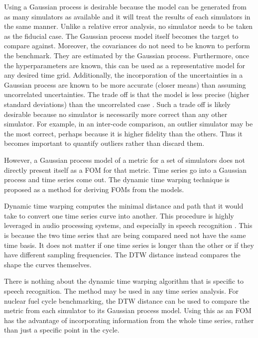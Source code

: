 Using a Gaussian process is desirable because the model can be generated
from as many simulators as available and it will treat the results of
each simulators in the same manner. Unlike a relative error analysis, no 
simulator needs to be taken as the fiducial case. The Gaussian process model 
itself becomes the target to compare against. 
Moreover, the covariances do not need to be known to perform the benchmark.
They are estimated by the Gaussian process. Furthermore, once the 
hyperparameters are known, this can be used as a representative model for 
any desired time grid. Additionally, the incorporation of the uncertainties
in a Gaussian process are known to be more accurate (closer means) than 
assuming uncorrelated uncertainties.  The trade off is that the 
model is less precise (higher standard deviations) than the uncorrelated 
case \cite{hodlr}. Such a trade off is likely desirable because no simulator 
is necessarily more correct than any other simulator. For example, 
in an inter-code comparison, an outlier simulator may be the 
most correct, perhaps because it is higher fidelity than the others. Thus it
becomes important to quantify outliers rather than discard them.

However, a Gaussian process model of a metric for a set of simulators 
does not directly present itself as a FOM for that metric. Time series go 
into a Gaussian process and time series come out. The dynamic time warping 
technique is proposed as a method for deriving FOMs from the models.  

Dynamic time warping computes the minimal distance and path that it would 
take to convert one time series curve into another. This procedure is highly 
leveraged in audio processing systems, and especially in speech recognition
\cite{myers1980performance,muda2010voice}.
This is because the two time series that are being compared need not have
the same time basis.  It does not matter if one time series is longer than 
the other or if they have different sampling frequencies. The DTW distance
instead compares the shape the curves themselves. 

There is nothing about the dynamic time warping algorithm that is specific 
to speech recognition. The method
may be used in any time series analysis. For nuclear fuel cycle benchmarking,
the DTW distance can be used to compare the metric from each simulator to its
Gaussian process model. Using this as an FOM has the advantage of 
incorporating information from the whole time series, rather than just a 
specific point in the cycle.

